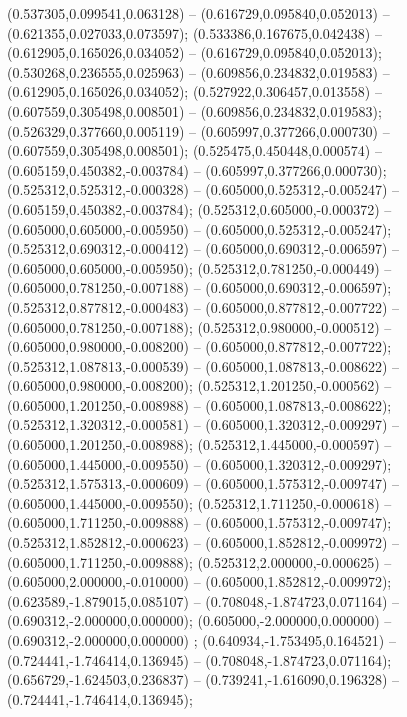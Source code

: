  (0.537305,0.099541,0.063128) -- (0.616729,0.095840,0.052013) -- (0.621355,0.027033,0.073597);
 (0.533386,0.167675,0.042438) -- (0.612905,0.165026,0.034052) -- (0.616729,0.095840,0.052013);
 (0.530268,0.236555,0.025963) -- (0.609856,0.234832,0.019583) -- (0.612905,0.165026,0.034052);
 (0.527922,0.306457,0.013558) -- (0.607559,0.305498,0.008501) -- (0.609856,0.234832,0.019583);
 (0.526329,0.377660,0.005119) -- (0.605997,0.377266,0.000730) -- (0.607559,0.305498,0.008501);
 (0.525475,0.450448,0.000574) -- (0.605159,0.450382,-0.003784) -- (0.605997,0.377266,0.000730);
 (0.525312,0.525312,-0.000328) -- (0.605000,0.525312,-0.005247) -- (0.605159,0.450382,-0.003784);
 (0.525312,0.605000,-0.000372) -- (0.605000,0.605000,-0.005950) -- (0.605000,0.525312,-0.005247);
 (0.525312,0.690312,-0.000412) -- (0.605000,0.690312,-0.006597) -- (0.605000,0.605000,-0.005950);
 (0.525312,0.781250,-0.000449) -- (0.605000,0.781250,-0.007188) -- (0.605000,0.690312,-0.006597);
 (0.525312,0.877812,-0.000483) -- (0.605000,0.877812,-0.007722) -- (0.605000,0.781250,-0.007188);
 (0.525312,0.980000,-0.000512) -- (0.605000,0.980000,-0.008200) -- (0.605000,0.877812,-0.007722);
 (0.525312,1.087813,-0.000539) -- (0.605000,1.087813,-0.008622) -- (0.605000,0.980000,-0.008200);
 (0.525312,1.201250,-0.000562) -- (0.605000,1.201250,-0.008988) -- (0.605000,1.087813,-0.008622);
 (0.525312,1.320312,-0.000581) -- (0.605000,1.320312,-0.009297) -- (0.605000,1.201250,-0.008988);
 (0.525312,1.445000,-0.000597) -- (0.605000,1.445000,-0.009550) -- (0.605000,1.320312,-0.009297);
 (0.525312,1.575313,-0.000609) -- (0.605000,1.575312,-0.009747) -- (0.605000,1.445000,-0.009550);
 (0.525312,1.711250,-0.000618) -- (0.605000,1.711250,-0.009888) -- (0.605000,1.575312,-0.009747);
 (0.525312,1.852812,-0.000623) -- (0.605000,1.852812,-0.009972) -- (0.605000,1.711250,-0.009888);
 (0.525312,2.000000,-0.000625) -- (0.605000,2.000000,-0.010000) -- (0.605000,1.852812,-0.009972);
 (0.623589,-1.879015,0.085107) -- (0.708048,-1.874723,0.071164) -- (0.690312,-2.000000,0.000000);
 (0.605000,-2.000000,0.000000) -- (0.690312,-2.000000,0.000000) ;
 (0.640934,-1.753495,0.164521) -- (0.724441,-1.746414,0.136945) -- (0.708048,-1.874723,0.071164);
 (0.656729,-1.624503,0.236837) -- (0.739241,-1.616090,0.196328) -- (0.724441,-1.746414,0.136945);
